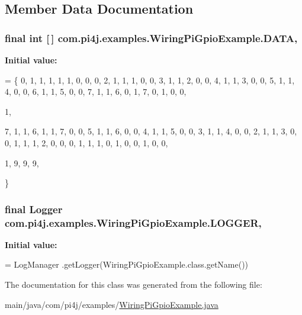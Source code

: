 \subsection{Member Data Documentation}
\hypertarget{classcom_1_1pi4j_1_1examples_1_1WiringPiGpioExample_a572ac65411fd1bff9c8ff4520800471a}{}
\subsubsection[{D\+A\+T\+A}]{\setlength{\rightskip}{0pt plus 5cm}final int \mbox{[}$\,$\mbox{]} com.\+pi4j.\+examples.\+Wiring\+Pi\+Gpio\+Example.\+D\+A\+T\+A\hspace{0.3cm}{\ttfamily [static]}, {\ttfamily [private]}}\label{classcom_1_1pi4j_1_1examples_1_1WiringPiGpioExample_a572ac65411fd1bff9c8ff4520800471a}
{\bfseries Initial value\+:}
\begin{DoxyCode}
= \{ 0, 1, 1, 1, 1, 1, 0, 0, 0, 2, 1, 1, 1,
            0, 0, 3, 1, 1, 2, 0, 0, 4, 1, 1, 3, 0, 0, 5, 1, 1, 4, 0, 0, 6, 1,
            1, 5, 0, 0, 7, 1, 1, 6, 0, 1, 7, 0, 1,
            0,
            0,
            
            1,
            
            7, 1, 1, 6, 1, 1, 7, 0, 0, 5, 1, 1, 6, 0, 0, 4, 1, 1, 5, 0, 0, 3,
            1, 1, 4, 0, 0, 2, 1, 1, 3, 0, 0, 1, 1, 1, 2, 0, 0, 0, 1, 1, 1, 0,
            1, 0, 0, 1, 0, 0,
            
            1, 9, 9, 9,
    
    \}
\end{DoxyCode}
\hypertarget{classcom_1_1pi4j_1_1examples_1_1WiringPiGpioExample_a921e49acca89ed226d4f6be6e1eba1b6}{}
\subsubsection[{L\+O\+G\+G\+E\+R}]{\setlength{\rightskip}{0pt plus 5cm}final Logger com.\+pi4j.\+examples.\+Wiring\+Pi\+Gpio\+Example.\+L\+O\+G\+G\+E\+R\hspace{0.3cm}{\ttfamily [static]}, {\ttfamily [private]}}\label{classcom_1_1pi4j_1_1examples_1_1WiringPiGpioExample_a921e49acca89ed226d4f6be6e1eba1b6}
{\bfseries Initial value\+:}
\begin{DoxyCode}
= LogManager
            .getLogger(WiringPiGpioExample.class.getName())
\end{DoxyCode}


The documentation for this class was generated from the following file\+:\begin{DoxyCompactItemize}
\item 
main/java/com/pi4j/examples/\hyperlink{WiringPiGpioExample_8java}{Wiring\+Pi\+Gpio\+Example.\+java}\end{DoxyCompactItemize}
